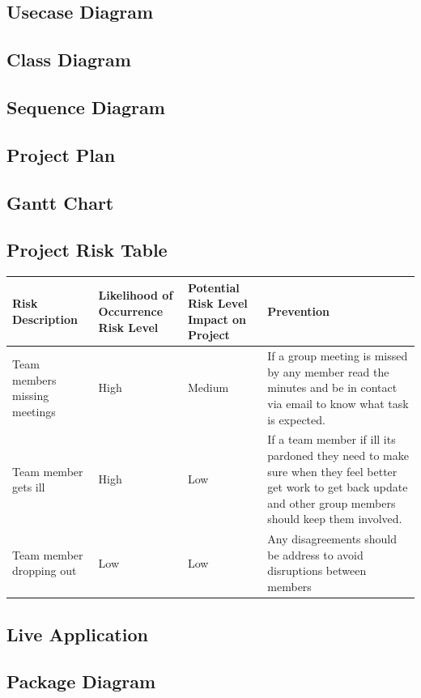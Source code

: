 \documentclass[11pt]{article}
\begin{document}
	\subsection{Usecase Diagram} 
	\subsection{Class Diagram}
	\subsection{Sequence Diagram}
	\subsection{Project Plan} %
	\subsection{Gantt Chart}
	\subsection{Project Risk Table}
	\begin{tabular}{|m{4cm}|m{3cm}|m{}|m{}|}
	\textbf{Risk Description} & \textbf{Likelihood of Occurrence Risk Level} & \textbf{Potential Risk Level Impact on Project} & \textbf{Prevention}\\ \hline 
	Team members missing meetings & High & Medium & If a group meeting is missed by any member read the minutes and be in contact via email to know what task is expected. \\ \hline
	Team member gets ill & High & Low & If a team member if ill its pardoned they need to make sure when they feel better get work to get back update and other group members should keep them involved. \\ \hline
	Team member dropping out & Low & Low & Any disagreements should be address to avoid disruptions between members \\ \hline
	\end{tabular}
	\subsection{Live Application}
	\subsection{Package Diagram}
\end{document}
